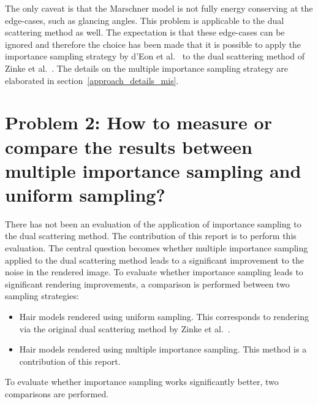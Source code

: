 \documentclass[11pt,a4paper]{report}
\begin{document}
The only caveat is that the Marschner model is not fully energy conserving at the edge-cases, such as glancing angles. This problem is applicable to the dual scattering method as well. The expectation is that these edge-cases can be ignored and therefore the choice has been made that it is possible to apply the importance sampling strategy by d'Eon et al.~\cite{eon2013} to the dual scattering method of Zinke et al.~\cite{zinke}. The details on the multiple importance sampling strategy are elaborated in section~\ref{approach_details_mis}.





\section{Problem 2: How to measure or compare the results between multiple importance sampling and uniform sampling?}

There has not been an evaluation of the application of importance sampling to the dual scattering method. The contribution of this report is to perform this evaluation. The central question becomes whether multiple importance sampling applied to the dual scattering method leads to a significant improvement to the noise in the rendered image. To evaluate whether importance sampling leads to significant rendering improvements, a comparison is performed between two sampling strategies:

\begin{itemize}
\item Hair models rendered using uniform sampling. This corresponds to rendering via the original dual scattering method by Zinke et al.~\cite{zinke}.
\item Hair models rendered using multiple importance sampling. This method is a contribution of this report.
\end{itemize}

To evaluate whether importance sampling works significantly better, two comparisons are performed.
\end{document}
